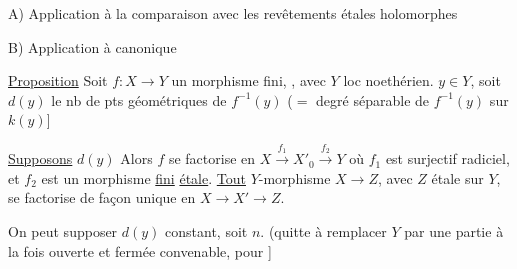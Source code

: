  A) Application à la comparaison avec les revêtements étales holomorphes

B) Application à   canonique

\uline{Proposition} \quad Soit $f:X\longrightarrow Y$ un morphisme fini, ,  avec $Y$ loc noethérien.   $y\in Y$, soit $d(y)$ le nb de pts géométriques de $f^{-1}(y)$ ($=$ degré séparable de $f^{-1}(y)$ sur $k(y)$]

\uline{Supposons} $d(y)$  Alors $f$ se factorise en $X\xrightarrow{f_1}X'_0\xrightarrow{f_2}Y$ où $f_1$ est  surjectif radiciel, et $f_2$ est un morphisme \uline{fini} \uline{étale}.  \uline{Tout} $Y$-morphisme $X\longrightarrow Z$,  avec $Z$ étale sur $Y$, se factorise de façon unique en $X\longrightarrow X'\longrightarrow Z$.

On peut supposer  $d(y)$ constant, soit $n$. (quitte à remplacer $Y$ par une partie à la fois ouverte et fermée convenable, pour ]


